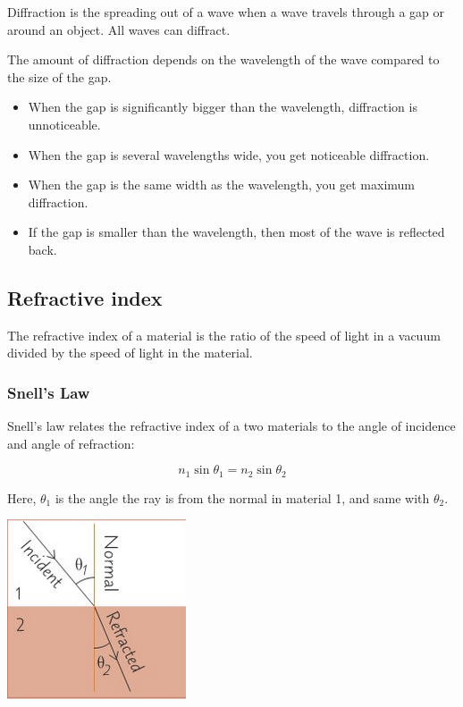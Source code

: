 \documentclass[a4paper, 12pt]{article}
\begin{document}
Diffraction is the spreading out of a wave when a wave travels through a gap or around an object.
All waves can diffract.

The amount of diffraction depends on the wavelength of the wave compared to the size of the gap.

\begin{itemize}
	\item{When the gap is significantly bigger than the wavelength, diffraction is unnoticeable.}
	\item{When the gap is several wavelengths wide, you get noticeable diffraction.}
	\item{When the gap is the same width as the wavelength, you get maximum diffraction.}
	\item{If the gap is smaller than the wavelength, then most of the wave is reflected back.}
\end{itemize}

\subsection{Refractive index}

The refractive index of a material is the ratio of the speed of light in a vacuum divided by the speed of light in the material.

\subsubsection{Snell's Law}

Snell's law relates the refractive index of a two materials to the angle of incidence and angle of refraction:

$$
n_1 \sin{\theta_1} = n_2 \sin{\theta_2}
$$

Here, $\theta_1$ is the angle the ray is from the normal in material 1, and same with $\theta_2$.

\begin{center}
\includegraphics[]{images/incidentAngle.png}
\end{center}
\end{document}
